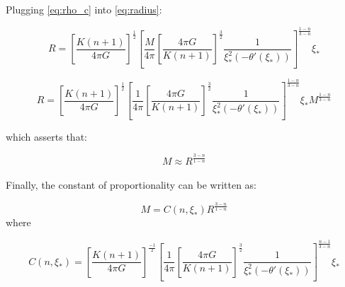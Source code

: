 \documentclass[letterpaper,12pt]{article}
\begin{document}
Plugging \eqref{eq:rho_c} into \eqref{eq:radius}:

\begin{equation*}
    R = \left[\frac{K \left(n+1\right)}{4 \pi G}\right]^{\frac{1}{2}} \left[\frac{M}{4 \pi} \left[\frac{4 \pi G}{K \left(n+1\right)}\right]^{\frac{3}{2}}  \frac{1}{\xi_*^2\left(-\theta'(\xi_*)\right)}\right]^{\frac{1-n}{3-n}} \xi_* 
\end{equation*}

\begin{equation*}
    R =  \left[\frac{K \left(n+1\right)}{4 \pi G}\right]^{\frac{1}{2}} \left[\frac{1}{4 \pi} \left[\frac{4 \pi G}{K \left(n+1\right)}\right]^{\frac{3}{2}}  \frac{1}{\xi_*^2\left(-\theta'(\xi_*)\right)}\right]^{\frac{1-n}{3-n}} \xi_* M^{\frac{1-n}{3-n}} 
\end{equation*}

which asserts that:

\begin{equation*}
    M \approx R^{\frac{3-n}{1-n}}
\end{equation*}

\paragraph{} Finally, the constant of proportionality can be written as:

\begin{equation*}
    M = C(n, \xi_*) R^{\frac{3-n}{1-n}} 
\end{equation*}
where 

\begin{equation*}
    C(n, \xi_*) =  \left[\frac{K \left(n+1\right)}{4 \pi G}\right]^{\frac{-1}{2}} \left[\frac{1}{4 \pi} \left[\frac{4 \pi G}{K \left(n+1\right)}\right]^{\frac{3}{2}}  \frac{1}{\xi_*^2\left(-\theta'(\xi_*)\right)}\right]^{\frac{n-1}{3-n}} \xi_* 
\end{equation*}
\end{document}
